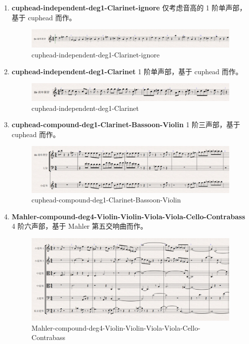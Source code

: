 \documentclass[11pt]{article}
\begin{document}
\begin{enumerate}
\item \textbf{cuphead-independent-deg1-Clarinet-ignore} 仅考虑音高的 1 阶单声部，基于 cuphead 而作。
\begin{figure}[hptb]
	\centering
	\label{fig:cuphead-independent-deg1-Clarinet-ignore}
	\includegraphics[width=\textwidth]{pic/cuphead-independent-deg1-Clarinet-ignore.eps}
	\caption{cuphead-independent-deg1-Clarinet-ignore}
\end{figure}

\item \textbf{cuphead-independent-deg1-Clarinet} 1 阶单声部，基于 cuphead 而作。
\begin{figure}[hptb]
	\centering
	\label{fig:cuphead-independent-deg1-Clarinet}
	\includegraphics[width=\textwidth]{pic/cuphead-independent-deg1-Clarinet.eps}
	\caption{cuphead-independent-deg1-Clarinet}
\end{figure}

\item \textbf{cuphead-compound-deg1-Clarinet-Bassoon-Violin} 1 阶三声部，基于 cuphead 而作。
\begin{figure}[hptb]
	\centering
	\label{fig:cuphead-compound-deg1-Clarinet-Bassoon-Violin}
	\includegraphics[width=\textwidth]{pic/cuphead-compound-deg1-Clarinet-Bassoon-Violin.eps}
	\caption{cuphead-compound-deg1-Clarinet-Bassoon-Violin}
\end{figure}

\item \textbf{Mahler-compound-deg4-Violin-Violin-Viola-Viola-Cello-Contrabass} 4 阶六声部，基于 Mahler 第五交响曲而作。
\begin{figure}[hptb]
	\centering
	\label{fig:Mahler-compound-deg4-Violin-Violin-Viola-Viola-Cello-Contrabass}
	\includegraphics[width=\textwidth]{pic/Mahler-compound-deg4-Violin-Violin-Viola-Viola-Cello-Contrabass.eps}
	\caption{Mahler-compound-deg4-Violin-Violin-Viola-Viola-Cello-Contrabass}
\end{figure}


\end{enumerate}
\end{document}
